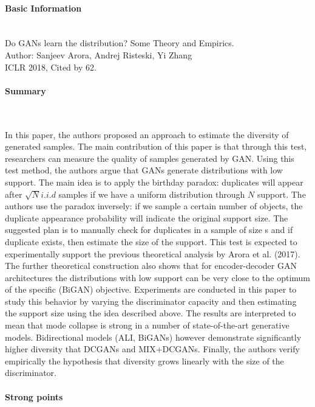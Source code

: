 \documentclass{article}
\begin{document}
\thispagestyle{empty}

\paragraph{Basic Information}  \ \\
Do GANs learn the distribution? Some Theory and Empirics. \\
Author: Sanjeev Arora, Andrej Risteski, Yi Zhang\\
ICLR 2018, Cited by 62.

\paragraph{Summary}  \  

In this paper, the authors proposed an approach to estimate the diversity of generated samples. The main contribution of this paper is that through this test, researchers can measure the quality of samples generated by GAN. Using this test method, the authors argue that GANs generate distributions with low support. The main idea is to apply the birthday paradox: duplicates will appear after $\sqrt{N} i.i.d$ samples if we have a uniform distribution through $N$ support. The authors use the paradox inversely: if we sample a certain number of objects, the duplicate appearance probability  will indicate the original support size. The suggested plan is to manually check for duplicates in a sample of size s and if duplicate exists, then estimate the size of the support.
This test is expected to experimentally support the previous theoretical analysis by Arora et al. (2017). The further theoretical construction also shows that for encoder-decoder GAN architectures the distributions with low support can be very close to the optimum of the specific (BiGAN) objective.
Experiments are conducted in this paper to study this behavior by varying the discriminator capacity and then estimating the support size using the idea described above. The results are interpreted to mean that mode collapse is strong in a number of state-of-the-art generative models.
Bidirectional models (ALI, BiGANs) however demonstrate significantly higher diversity that DCGANs and MIX+DCGANs.
Finally, the authors verify empirically the hypothesis that diversity grows linearly with the size of the discriminator.

\paragraph{Strong points}  \  
\end{document}
